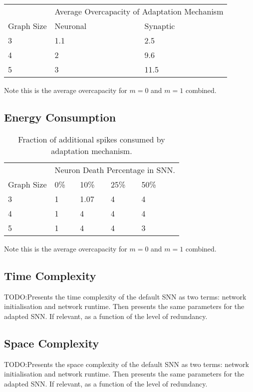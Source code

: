 \begin{table}[H]
\begin{tabular}{lll}
           & \multicolumn{2}{l}{Average Overcapacity of Adaptation Mechanism} \\ \cmidrule{2-3}
           Graph Size & Neuronal     & Synaptic                   \\ \hline 
3       & 1.1          & 2.5                        \\
4      & 2            & 9.6                          \\
5      & 3            & 11.5                         
\end{tabular}
\end{table}
Note this is the average overcapacity for $m=0$ and $m=1$ combined.

\subsection{Energy Consumption}\label{subsec:results_energy_consumption}
\begin{table}[H]
\caption{Fraction of additional spikes consumed by adaptation mechanism.}
\begin{tabular}{llllll}
           & \multicolumn{5}{l}{Neuron Death Percentage in SNN.} \\ \cmidrule{2-6} %
          Graph Size & 0\%    & 10\%    & 25\%    & 50\% \\ \hline
3      & 1    & 1.07     & 4       & 4             \\
4      & 1      & 4       & 4       & 4            \\
5      & 1      & 4       & 4       & 3           
\end{tabular}
\end{table}
Note this is the average overcapacity for $m=0$ and $m=1$ combined.

\subsection{Time Complexity}\label{subsec:time_complexity}
TODO:Presents the time complexity of the default SNN as two terms: network initialisation and network runtime. Then presents the same parameters for the adapted SNN. If relevant, as a function of the level of redundancy.

\subsection{Space Complexity}\label{subsec:time_complexity}
TODO:Presents the space complexity of the default SNN as two terms: network initialisation and network runtime. Then presents the same parameters for the adapted SNN. If relevant, as a function of the level of redundancy.
